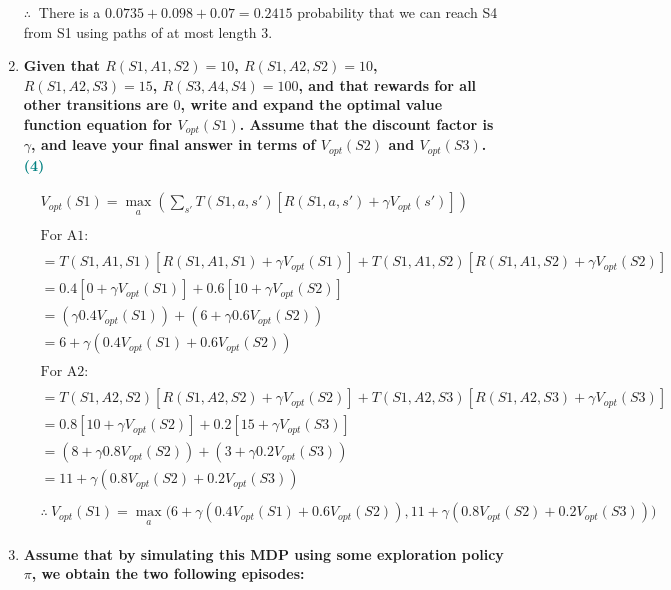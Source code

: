 \documentclass[a4paper]{article}
\begin{document}
\begin{sloppypar}
\begin{enumerate}[start=8,label=Q\arabic*,left=0pt]
    $\therefore \:$ There is a $0.0735 + 0.098 + 0.07 = 0.2415$ probability that we can reach S4 from S1 using paths of at most length 3.

    \item \textbf{Given that $R(S1, A1, S2) = 10$, $R(S1, A2, S2) = 10$, $R(S1, A2, S3) = 15$, $R(S3, A4, S4) = 100$, 
    and that rewards for all other transitions are $0$, write and expand the optimal value
    function equation for $V_{opt}(S1)$. Assume that the discount factor is $\gamma$, and leave your final
    answer in terms of $V_{opt}(S2)$ and $V_{opt}(S3)$. \hfill \textcolor{teal}{(4)}}
    
    \begin{align*}
        & V_{opt}(S1) = \max_{\substack{a}}\left(\sum_{s'}T(S1, a, s')[R(S1, a, s') + \gamma V_{opt}(s')]\right) \\\\
        & \text{For A1:} \\\\
        & = T(S1, A1, S1)[R(S1, A1, S1) + \gamma V_{opt}(S1)] + T(S1, A1, S2)[R(S1, A1, S2) + \gamma V_{opt}(S2)] \\
        & = 0.4[0 + \gamma V_{opt}(S1)] + 0.6[10 + \gamma V_{opt}(S2)] \\
        & = (\gamma 0.4 V_{opt}(S1)) + (6 + \gamma 0.6 V_{opt}(S2)) \\
        & = 6 + \gamma(0.4 V_{opt}(S1) + 0.6 V_{opt}(S2)) \\\\
        & \text{For A2:} \\\\
        & = T(S1, A2, S2)[R(S1, A2, S2) + \gamma V_{opt}(S2)] + T(S1, A2, S3)[R(S1, A2, S3) + \gamma V_{opt}(S3)] \\
        & = 0.8[10 + \gamma V_{opt}(S2)] + 0.2[15 + \gamma V_{opt}(S3)] \\
        & = (8 + \gamma 0.8 V_{opt}(S2)) + (3 + \gamma 0.2 V_{opt}(S3)) \\
        & = 11 + \gamma(0.8 V_{opt}(S2) + 0.2 V_{opt}(S3)) \\\\
        & \therefore \: V_{opt}(S1) = \max_{\substack{a}} \biggl( 6 + \gamma(0.4 V_{opt}(S1) + 0.6 V_{opt}(S2)), 11 + \gamma(0.8 V_{opt}(S2) + 0.2 V_{opt}(S3)) \biggr)
    \end{align*}

    \item \textbf{Assume that by simulating this MDP using some exploration policy $\pi$, we obtain the
    two following episodes:}


\end{enumerate}
\end{sloppypar}
\end{document}

